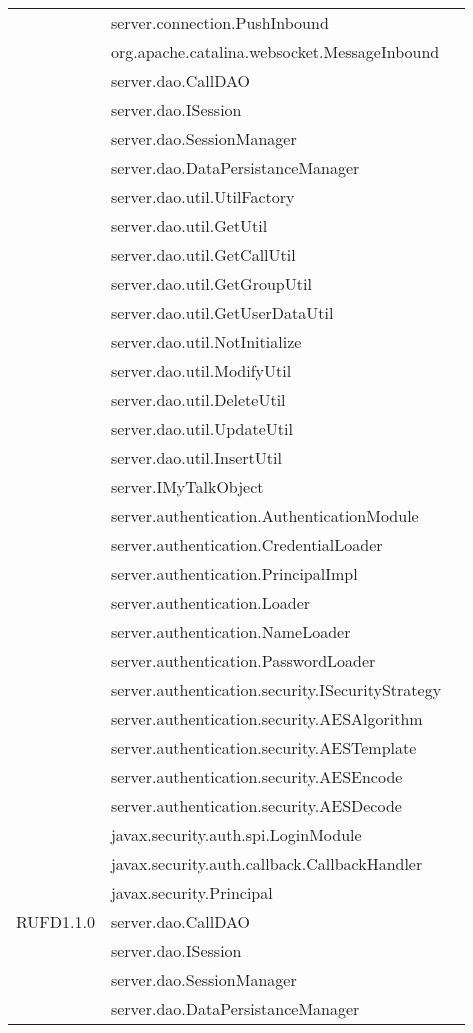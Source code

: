 \begin{center}
\begin{longtable}{lp{}l}
 & server.connection.PushInbound\\
& org.apache.catalina.websocket.MessageInbound\\
 & server.dao.CallDAO\\
& server.dao.ISession\\
& server.dao.SessionManager\\
& server.dao.DataPersistanceManager\\
& server.dao.util.UtilFactory\\
& server.dao.util.GetUtil\\
& server.dao.util.GetCallUtil\\
& server.dao.util.GetGroupUtil\\
& server.dao.util.GetUserDataUtil\\
& server.dao.util.NotInitialize\\
& server.dao.util.ModifyUtil\\
& server.dao.util.DeleteUtil\\
& server.dao.util.UpdateUtil\\
& server.dao.util.InsertUtil\\
& server.IMyTalkObject\\
& server.authentication.AuthenticationModule\\
& server.authentication.CredentialLoader\\
& server.authentication.PrincipalImpl\\
& server.authentication.Loader\\
& server.authentication.NameLoader\\
& server.authentication.PasswordLoader\\
& server.authentication.security.ISecurityStrategy\\
& server.authentication.security.AESAlgorithm\\
& server.authentication.security.AESTemplate\\
& server.authentication.security.AESEncode\\
& server.authentication.security.AESDecode\\
& javax.security.auth.spi.LoginModule\\
& javax.security.auth.callback.CallbackHandler\\
& javax.security.Principal\\
RUFD1.1.0 & server.dao.CallDAO\\
& server.dao.ISession\\
& server.dao.SessionManager\\
& server.dao.DataPersistanceManager\\

\end{longtable}
\end{center}

